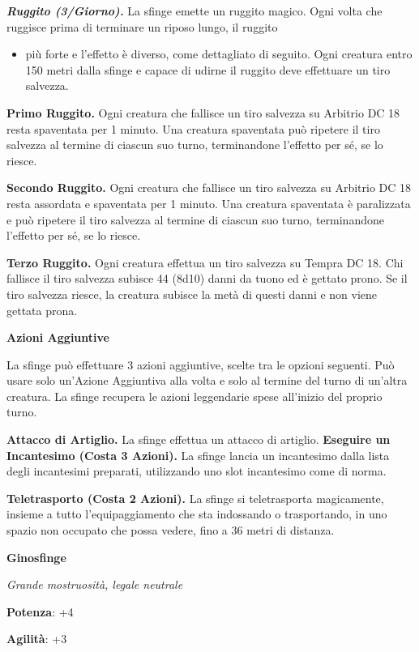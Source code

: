 \begin{multicols}{2}
\emph{\textbf{Ruggito (3/Giorno).}} La sfinge emette un ruggito magico.
Ogni volta che ruggisce prima di terminare un riposo lungo, il ruggito


\begin{itemize}
\item
  più forte e l'effetto è diverso, come dettagliato di seguito. Ogni
  creatura entro 150 metri dalla sfinge e capace di udirne il ruggito
  deve effettuare un tiro salvezza.
\end{itemize}


\textbf{Primo Ruggito.} Ogni creatura che fallisce un tiro salvezza su Arbitrio DC 18 resta spaventata per 1 minuto. Una creatura spaventata
può ripetere il tiro salvezza al termine di ciascun suo turno,
terminandone l'effetto per sé, se lo riesce.

\textbf{Secondo Ruggito.} Ogni creatura che fallisce un tiro salvezza su Arbitrio DC 18 resta assordata e spaventata per 1 minuto. Una creatura
spaventata è paralizzata e può ripetere il tiro salvezza al termine di
ciascun suo turno, terminandone l'effetto per sé, se lo riesce.

\textbf{Terzo Ruggito.} Ogni creatura effettua un tiro salvezza su Tempra DC 18. Chi fallisce il tiro salvezza subisce 44 (8d10)
danni da tuono ed è gettato prono. Se il tiro salvezza riesce, la
creatura subisce la metà di questi danni e non viene gettata prona.

\textbf{Azioni Aggiuntive}

La sfinge può effettuare 3 azioni aggiuntive, scelte tra le opzioni
seguenti. Può usare solo un'Azione Aggiuntiva alla volta e solo al
termine del turno di un'altra creatura. La sfinge recupera le azioni
leggendarie spese all'inizio del proprio turno.

\textbf{Attacco di Artiglio.} La sfinge effettua un attacco di artiglio.
\textbf{Eseguire un Incantesimo (Costa 3 Azioni).} La sfinge lancia un
incantesimo dalla lista degli incantesimi preparati, utilizzando uno
slot incantesimo come di norma.

\textbf{Teletrasporto (Costa 2 Azioni).} La sfinge si teletrasporta
magicamente, insieme a tutto l'equipaggiamento che sta indossando o
trasportando, in uno spazio non occupato che possa vedere, fino a 36
metri di distanza.


\textbf{Ginosfinge}

\emph{Grande mostruosità, legale neutrale}

\textbf{Potenza}: +4

\textbf{Agilità}: +3


\end{multicols}
